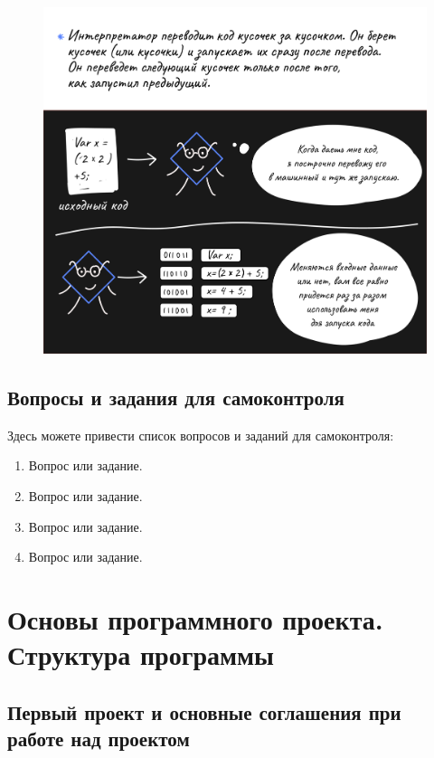 \begin{figure}[h!]\center
  \includegraphics[width=0.9\linewidth]{images/pic1-6.png}
\end{figure}
\newpage
\section*{Вопросы и задания для самоконтроля}%

Здесь можете привести список вопросов и заданий для самоконтроля:
\begin{enumerate}%
\item Вопрос или задание.
\item Вопрос или задание.
\item Вопрос или задание.
\item Вопрос или задание.
\end{enumerate}%

\newpage
\chapter{Основы программного проекта. Структура программы}
\section{Первый проект и основные соглашения при работе над проектом}

